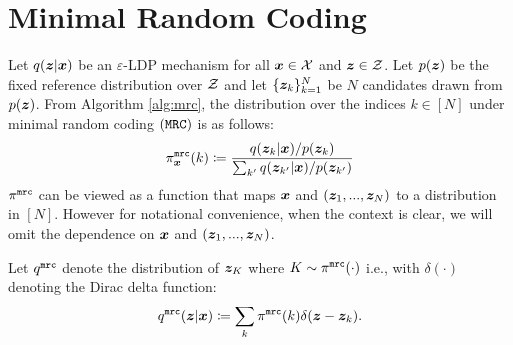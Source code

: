 \section{Minimal Random Coding}
\label{appendix:mrc}

Let $q({\boldsymbol{z}}|{\boldsymbol{x}})$ be an $\varepsilon$-LDP mechanism for all ${\boldsymbol{x}} \in \mathcal{X}$ and ${\boldsymbol{z}} \in \mathcal{Z}$. Let $p({\boldsymbol{z}})$ be the fixed reference distribution over $\mathcal{Z}$ and let $\{{\boldsymbol{z}}_k\}_{k=1}^{N}$ be $N$ candidates drawn from $p({\boldsymbol{z}})$. From Algorithm \ref{alg:mrc}, the distribution over the indices $k \in [N]$ under minimal random coding $(\texttt{MRC})$ is as follows:
\begin{align}
  \pi^{\texttt{mrc}}_{{\boldsymbol{x}}}(k) \coloneqq \dfrac{q({\boldsymbol{z}}_k|{\boldsymbol{x}})/p({\boldsymbol{z}}_k)}{\sum_{k'} q({\boldsymbol{z}}_{k'}|{\boldsymbol{x}})/p({\boldsymbol{z}}_{k'})}  \label{eq:generic_pi} 
\end{align}
$\pi^{\texttt{mrc}}$ can be viewed as a function that maps ${\boldsymbol{x}}$ and $({\boldsymbol{z}}_1,...,{\boldsymbol{z}}_N)$ to a distribution in $[N]$. However for notational convenience, when the context is clear, we will omit the dependence on ${\boldsymbol{x}}$ and $({\boldsymbol{z}}_1,...,{\boldsymbol{z}}_N)$. 


Let $q^{\texttt{mrc}}$ denote the distribution of ${\boldsymbol{z}}_K$ where $K \sim \pi^{\texttt{mrc}}(\cdot)$ i.e., with $\delta(\cdot)$ denoting the Dirac delta function:
\begin{align}
    q^{\texttt{mrc}}({\boldsymbol{z}} | {\boldsymbol{x}}) \coloneqq \sum_{k} \pi^{\texttt{mrc}}(k) \delta({\boldsymbol{z}} - {\boldsymbol{z}}_k). \label{eq:qmrc}
\end{align}


